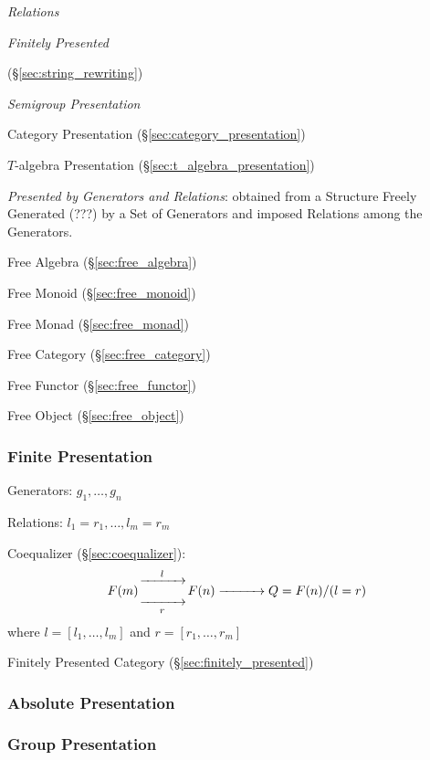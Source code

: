 \emph{Relations}

\emph{Finitely Presented}

(\S\ref{sec:string_rewriting})

\emph{Semigroup Presentation}

Category Presentation (\S\ref{sec:category_presentation})

$T$-algebra Presentation (\S\ref{sec:t_algebra_presentation})

\emph{Presented by Generators and Relations}: obtained from a
Structure Freely Generated (???) by a Set of Generators and imposed
Relations among the Generators.

Free Algebra (\S\ref{sec:free_algebra})

Free Monoid (\S\ref{sec:free_monoid})

Free Monad (\S\ref{sec:free_monad})

Free Category (\S\ref{sec:free_category})

Free Functor (\S\ref{sec:free_functor})

Free Object (\S\ref{sec:free_object})



\subsubsection{Finite Presentation}\label{sec:finite_presentation}
\cite{awodey06}

Generators: $g_1, \ldots, g_n$

Relations: $l_1 = r_1, \ldots, l_m = r_m$

Coequalizer (\S\ref{sec:coequalizer}):
\[
  F(m) {\xrightarrow[\quad\quad\quad]{l}
    \atop \xrightarrow[r]{\quad\quad\quad}} F(n)
  \xrightarrow{\quad\quad\quad} Q = F(n) / (l = r)
\]
where $l = [l_1, \ldots, l_m]$ and $r = [r_1, \ldots, r_m]$

Finitely Presented Category (\S\ref{sec:finitely_presented})



\subsubsection{Absolute Presentation}\label{sec:absolute_presentation}

\subsubsection{Group Presentation}\label{sec:group_presentation}

